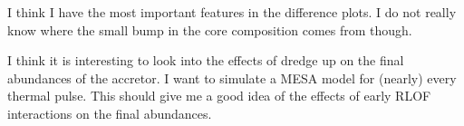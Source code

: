 \documentclass[a4paper,10pt]{article}
\begin{document}
I think I have the most important features in the difference plots.
I do not really know where the small bump
in the core composition comes from though.


\begin{figure}[ht]
	\centering
\end{figure}

\begin{figure}[ht]
	\centering
\end{figure}

\begin{figure}[ht]
	\centering
\end{figure}

\begin{figure}[ht]
	\centering
\end{figure}

\begin{figure}[ht]
	\centering
\end{figure}

\begin{figure}[ht]
	\centering
\end{figure}

\begin{figure}[ht]
	\centering
\end{figure}

\begin{figure}[ht]
	\centering
\end{figure}

\begin{figure}[ht]
	\centering
\end{figure}

\begin{figure}[ht]
	\centering
\end{figure}

I think it is interesting to look into the effects of dredge up on the final abundances of the accretor.
I want to simulate a MESA model for (nearly) every thermal pulse.
This should give me a good idea
of the effects of early RLOF interactions on the final abundances.
\end{document}
